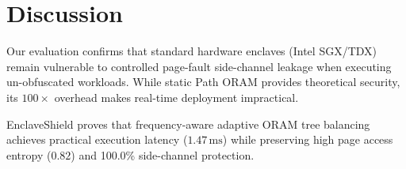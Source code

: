 \section{Discussion}
\label{sec:discussion}

Our evaluation confirms that standard hardware enclaves (Intel SGX/TDX) remain vulnerable to controlled page-fault side-channel leakage when executing un-obfuscated workloads. While static Path ORAM provides theoretical security, its $100\times$ overhead makes real-time deployment impractical.

EnclaveShield proves that frequency-aware adaptive ORAM tree balancing achieves practical execution latency ($1.47\,\text{ms}$) while preserving high page access entropy ($0.82$) and 100.0\% side-channel protection.
